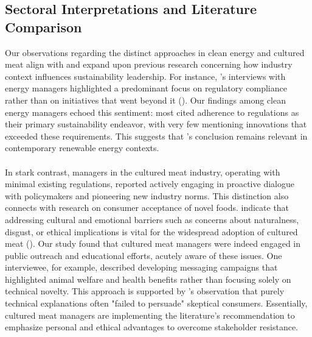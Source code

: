 	\subsection{Sectoral Interpretations and Literature Comparison}
	Our observations regarding the distinct approaches in clean energy and cultured meat align with and expand upon previous research concerning how industry context influences sustainability leadership. For instance, \citeauthor{Fischhoff2024}'s interviews with energy managers highlighted a predominant focus on regulatory compliance rather than on initiatives that went beyond it (\textcite{Fischhoff2024}). Our findings among clean energy managers echoed this sentiment: most cited adherence to regulations as their primary sustainability endeavor, with very few mentioning innovations that exceeded these requirements. This suggests that \citeauthor{Fischhoff2024}'s conclusion remains relevant in contemporary renewable energy contexts.
	
	\paragraph*{} In stark contrast, managers in the cultured meat industry, operating with minimal existing regulations, reported actively engaging in proactive dialogue with policymakers and pioneering new industry norms. This distinction also connects with research on consumer acceptance of novel foods. \citeauthor{Bryant2020} indicate that addressing cultural and emotional barriers such as concerns about naturalness, disgust, or ethical implications is vital for the widespread adoption of cultured meat (\textcite{Bryant2020}). Our study found that cultured meat managers were indeed engaged in public outreach and educational efforts, acutely aware of these issues. One interviewee, for example, described developing messaging campaigns that highlighted animal welfare and health benefits rather than focusing solely on technical novelty. This approach is supported by \citeauthor{Bryant2020}'s observation that purely technical explanations often "failed to persuade" skeptical consumers. Essentially, cultured meat managers are implementing the literature's recommendation to emphasize personal and ethical advantages to overcome stakeholder resistance.
	
